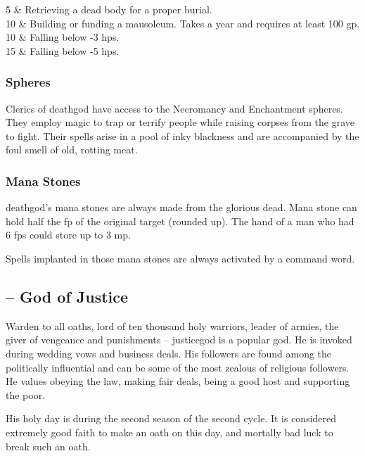 \begin{multicols}{2}
\begin{xpchart}{}
	5 & Retrieving a dead body for a proper burial. \\

	10 & Building or funding a mausoleum. Takes a year and requires at least 100 gp. \\

	10 & Falling below -3 \glspl{hp}. \\

	15 & Falling below -5 \glspl{hp}. \\

\end{xpchart}

\subsubsection{Spheres}

Clerics of \gls{deathgod} have access to the Necromancy and Enchantment spheres.
They employ magic to trap or terrify people while raising corpses from the grave to fight.
Their spells arise in a pool of inky blackness and are accompanied by the foul smell of old, rotting meat.

\subsubsection{Mana Stones}

\Gls{deathgod}'s mana stones are always made from the glorious dead.
Mana stone can hold half the \gls{fp} of the original target (rounded up).
The hand of a man who had 6 \glspl{fp} could store up to 3 \gls{mp}.

Spells implanted in those mana stones are always activated by a command word.

\subsection{ -- God of Justice}

\noindent Warden to all oaths, lord of ten thousand holy warriors, leader of armies, the giver of vengeance and punishments -- \gls{justicegod} is a popular god.
He is invoked during wedding vows and business deals.
His followers are found among the politically influential and can be some of the most zealous of religious followers.
He values obeying the law, making fair deals, being a good host and supporting the poor.

His holy day is during the second season of the second cycle.
It is considered extremely good faith to make an oath on this day, and mortally bad luck to break such an oath.


\end{multicols}
